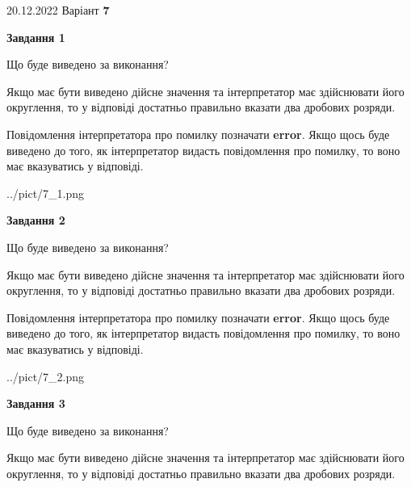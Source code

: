 \documentclass[12pt, ukrainian]{article}
\begin{document}
{20.12.2022 Варіант \No \textbf { 7 }\par}
{
\begin {Large}

{\begin {center}\textbf{Завдання 1}\end {center}}\par
Що буде виведено за виконання? \par

Якщо має бути виведено дійсне значення та інтерпретатор має здійснювати його округлення, 
то у відповіді достатньо правильно вказати два дробових розряди.

Повідомлення інтерпретатора про помилку позначати \textbf{error}.
Якщо щось буде виведено до того, як інтерпретатор видасть повідомлення про помилку, 
то воно має вказуватись у відповіді. \par

\begin{center}
	{../pict/7_1.png}
\end{center}
\newpage

{\begin {center}\textbf{Завдання 2}\end {center}}\par
Що буде виведено за виконання? \par

Якщо має бути виведено дійсне значення та інтерпретатор має здійснювати його округлення, 
то у відповіді достатньо правильно вказати два дробових розряди.

Повідомлення інтерпретатора про помилку позначати \textbf{error}.
Якщо щось буде виведено до того, як інтерпретатор видасть повідомлення про помилку, 
то воно має вказуватись у відповіді. \par

\begin{center}
	{../pict/7_2.png}
\end{center}
\newpage

{\begin {center}\textbf{Завдання 3}\end {center}}\par
Що буде виведено за виконання? \par

Якщо має бути виведено дійсне значення та інтерпретатор має здійснювати його округлення, 
то у відповіді достатньо правильно вказати два дробових розряди.


\end{Large}}
\end{document}
